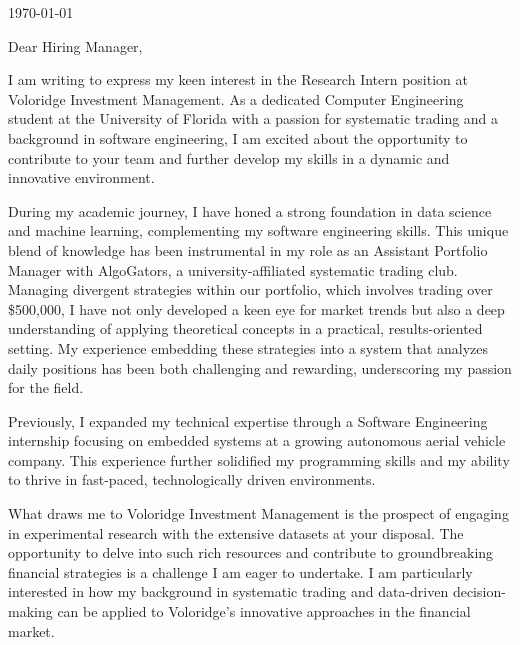 \documentclass{ExpressiveCoverLetter}
\begin{document}
\coverletterheader[
    firstname=Cole,
    middleinitial=H,
    lastname=Rottenberg,
    email=cole.rottenberg@gmail.com,
    phone=407-961-0600,
    linkedin=colerottenberg,
    github=colerotteberg,
    city=Orlando,
    state=Florida,
]

\vspace{0.25in}
\today
\vspace{0.15in}

Dear Hiring Manager,

I am writing to express my keen interest in the Research Intern position at Voloridge Investment Management. As a dedicated Computer Engineering student at the University of Florida with a passion for systematic trading and a background in software engineering, I am excited about the opportunity to contribute to your team and further develop my skills in a dynamic and innovative environment.

During my academic journey, I have honed a strong foundation in data
science and machine learning, complementing my software engineering
skills.
This unique blend of knowledge has been instrumental in my role as an
Assistant Portfolio Manager with AlgoGators, a university-affiliated
systematic trading club.
Managing divergent strategies within our portfolio, which
involves trading over \$500,000, I have not only developed a keen eye for
market trends but also a deep understanding of applying theoretical
concepts in a practical, results-oriented setting.
My experience embedding these strategies into a system that analyzes daily positions has been both challenging and rewarding, underscoring my passion for the field.

Previously, I expanded my technical expertise through a Software
Engineering internship focusing on embedded systems at a growing
autonomous aerial vehicle company.
This experience further solidified my programming skills and my ability to thrive in fast-paced, technologically driven environments.

What draws me to Voloridge Investment Management is the prospect of
engaging in experimental research with the extensive datasets at your
disposal.
The opportunity to delve into such rich resources and contribute to
groundbreaking financial strategies is a challenge I am eager to
undertake.
I am particularly interested in how my background in systematic trading and data-driven decision-making can be applied to Voloridge's innovative approaches in the financial market.
\end{document}
